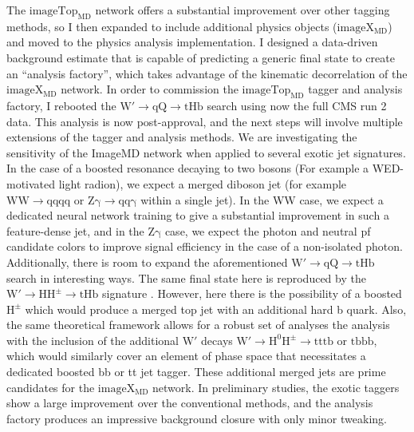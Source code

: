 \documentclass[12pt]{article}
\begin{document}
The $\mathrm{imageTop_{MD}}$ network offers a substantial improvement over other tagging
methods, so I then expanded to include additional physics objects ($\mathrm{imageX_{MD}}$) and
moved to the physics analysis implementation.  I designed a data-driven background estimate
that is capable of predicting a generic final state to create an ``analysis factory'',
which takes advantage of the kinematic decorrelation of the $\mathrm{imageX_{MD}}$ network.  In order
to commission the $\mathrm{imageTop_{MD}}$ tagger and analysis factory, I rebooted
the $\mathrm{W' \to qQ \to tHb}$ search using now the full CMS run 2 data. This analysis
is now post-approval, and the next steps will involve multiple extensions of the tagger and
analysis methods.  We are investigating the sensitivity of the ImageMD network when applied to several
exotic jet signatures.  In the case of a boosted resonance decaying to two bosons (For example a WED-motivated light radion),
we expect a merged diboson jet (for example $\mathrm{WW \to qqqq}$ or $\mathrm{Z\gamma \to qq\gamma}$ within a single jet).
In the WW case, we expect a dedicated neural network training to give a substantial improvement in
such a feature-dense jet, and in the $\mathrm{Z\gamma}$ case, we expect the photon and neutral pf
candidate colors to improve signal efficiency in the case of a non-isolated
photon.  Additionally, there is room to expand the aforementioned
$\mathrm{W' \to qQ \to tHb}$ search in interesting ways.  The same final state here is
reproduced by the $\mathrm{W' \to HH^{\pm} \to tHb}$ signature \cite{Dobrescu:2015yba}.
However, here there is the possibility of a boosted $\mathrm{H^{\pm}}$ which would produce a
merged top jet with an additional hard b quark.
Also, the same theoretical framework allows for a robust set of analyses the
analysis with the inclusion of the additional $\mathrm{W'}$ decays
$\mathrm{W' \to H^{0}H^{\pm} \to tttb}$ or $\mathrm{tbbb}$, which would similarly cover an element of phase space
that necessitates a dedicated boosted bb or tt jet tagger.
These additional merged jets are prime candidates for the $\mathrm{imageX_{MD}}$
network.  In preliminary studies, the exotic taggers show a large improvement over the
conventional methods, and the analysis factory produces an impressive background
closure with only minor tweaking.
\end{document}
